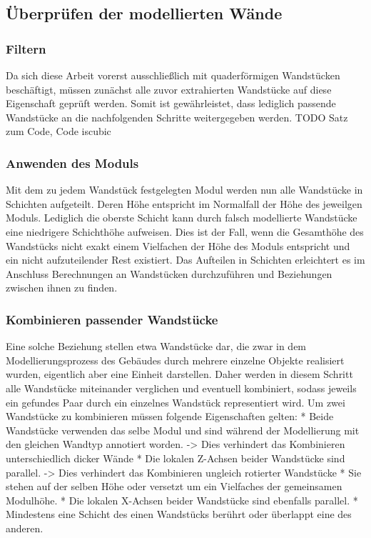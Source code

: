 \subsection{Überprüfen der modellierten Wände}
\subsubsection{Filtern}
Da sich diese Arbeit vorerst ausschließlich mit quaderförmigen Wandstücken beschäftigt, müssen zunächst alle zuvor extrahierten Wandstücke auf diese Eigenschaft geprüft werden.
Somit ist gewährleistet, dass lediglich passende Wandstücke an die nachfolgenden Schritte weitergegeben werden.
TODO Satz zum Code, Code iscubic

\subsubsection{Anwenden des Moduls}
Mit dem zu jedem Wandstück festgelegten Modul werden nun alle Wandstücke in Schichten aufgeteilt.
Deren Höhe entspricht im Normalfall der Höhe des jeweilgen Moduls.
Lediglich die oberste Schicht kann durch falsch modellierte Wandstücke eine niedrigere Schichthöhe aufweisen.
Dies ist der Fall, wenn die Gesamthöhe des Wandstücks nicht exakt einem Vielfachen der Höhe des Moduls entspricht und ein nicht aufzuteilender Rest existiert.
Das Aufteilen in Schichten erleichtert es im Anschluss Berechnungen an Wandstücken durchzuführen und Beziehungen zwischen ihnen zu finden.

\subsubsection{Kombinieren passender Wandstücke}
Eine solche Beziehung stellen etwa Wandstücke dar, die zwar in dem Modellierungsprozess des Gebäudes durch mehrere einzelne Objekte realisiert wurden, eigentlich aber eine Einheit darstellen.
Daher werden in diesem Schritt alle Wandstücke miteinander verglichen und eventuell kombiniert, sodass jeweils ein gefundes Paar durch ein einzelnes Wandstück representiert wird.
Um zwei Wandstücke zu kombinieren müssen folgende Eigenschaften gelten:
* Beide Wandstücke verwenden das selbe Modul und sind während der Modellierung mit den gleichen Wandtyp annotiert worden. -> Dies verhindert das Kombinieren unterschiedlich dicker Wände
* Die lokalen Z-Achsen beider Wandstücke sind parallel. -> Dies verhindert das Kombinieren ungleich rotierter Wandstücke
* Sie stehen auf der selben Höhe oder versetzt um ein Vielfaches der gemeinsamen Modulhöhe.
* Die lokalen X-Achsen beider Wandstücke sind ebenfalls parallel.
* Mindestens eine Schicht des einen Wandstücks berührt oder überlappt eine des anderen.

